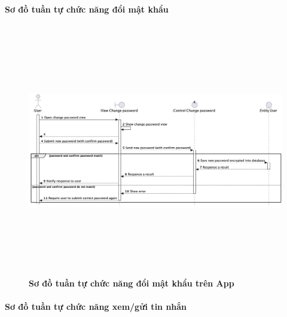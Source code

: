 \documentclass{article}%
\begin{document}
  \paragraph{Sơ đồ tuần tự chức năng đổi mật khẩu}
\mbox{}

  \begin{figure}[H]
        \centering
        \includegraphics[width=16cm,height=11cm]{Images/mobile_app/change_password.png}
        \caption[Sơ đồ tuần tự chức năng đổi mật khẩu trên App]{\bfseries \fontsize{12pt}{0pt}
        \selectfont Sơ đồ tuần tự chức năng đổi mật khẩu trên App}
        \label{hinh21} %
  \end{figure}


\paragraph{Sơ đồ tuần tự chức năng xem/gửi tin nhắn}
\mbox{}
\end{document}
